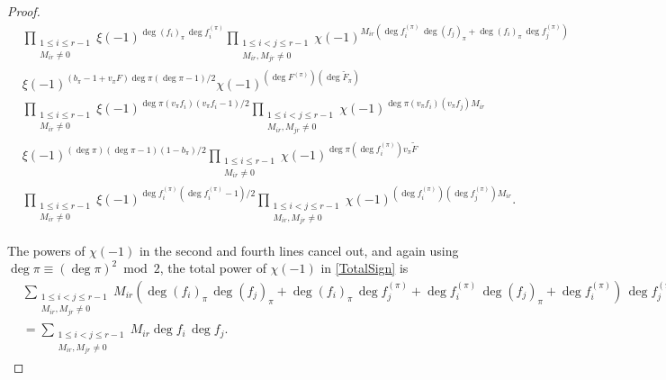\documentclass[11pt,letterpaper]{article}
\theoremstyle{definition}
\theoremstyle{remark}
\numberwithin{equation}{section}
\theoremstyle{dotless}
\renewcommand{\tilde}{\widetilde}
\begin{document}
\begin{proof}
\begin{equation} \label{TotalSign}
\begin{split}
& \prod_{\substack{1 \leq i \leq r-1 \\ M_{ir} \neq 0}} \xi(-1)^{\deg (f_i)_\pi \, \deg f_i^{(\pi)}} \prod_{\substack{1 \leq i<j \leq r-1 \\ M_{ir}, M_{jr} \neq 0}} \chi(-1)^{M_{ir}(\deg f_i^{(\pi)} \,\deg (f_j)_\pi + \deg (f_i)_{\pi} \,\deg f_j^{(\pi)})}  \\
&\xi(-1)^{(b_\pi-1+v_\pi F)\deg \pi(\deg \pi -1)/2} \chi(-1)^{(\deg F^{(\pi)})(\deg \tilde{F}_\pi)}\\
&\prod_{\substack{1 \leq i \leq r-1 \\ M_{ir} \neq 0}} \xi(-1)^{\deg \pi (v_\pi f_i)(v_\pi f_i-1)/2} \prod_{\substack{1 \leq i<j \leq r-1 \\ M_{ir}, M_{jr} \neq 0}} \chi(-1)^{\deg \pi(v_\pi f_i)(v_\pi f_j) M_{ir} } \\
& \xi(-1)^{(\deg \pi)(\deg \pi -1)(1-b_\pi)/2} \prod_{\substack{1 \leq i \leq r-1 \\ M_{ir} \neq 0}} \chi(-1)^{\deg \pi(\deg f_i^{(\pi)})v_\pi \tilde{F}} \\
&\prod_{\substack{1 \leq i \leq r-1 \\ M_{ir} \neq 0}} \xi(-1)^{\deg f_i^{(\pi)}(\deg f_i^{(\pi)}-1)/2} \prod_{\substack{1 \leq i<j \leq r-1 \\ M_{ir}, M_{jr} \neq 0}} \chi(-1)^{(\deg f_i^{(\pi)})(\deg f_j^{(\pi)}) M_{ir} }.
\end{split}
\end{equation}

The powers of $\chi(-1)$ in the second and fourth lines cancel out, and again using $\deg \pi \equiv (\deg \pi)^2 \bmod 2$, the total power of $\chi(-1)$ in \eqref{TotalSign} is 
\begin{equation*}
\begin{split}
    &\sum_{\substack{1 \leq i<j \leq r-1 \\ M_{ir}, M_{jr} \neq 0}} M_{ir}(\deg (f_i)_\pi \, \deg (f_j)_\pi+ \deg (f_i)_\pi \, \deg f_j^{(\pi)} + \deg f_i^{(\pi)} \, \deg (f_j)_\pi + \deg f_i^{(\pi)}) \, \deg f_j^{(\pi)} \\
    &=\sum_{\substack{1 \leq i<j \leq r-1 \\ M_{ir}, M_{jr} \neq 0}} M_{ir}\deg f_i \, \deg f_j.
\end{split}
\end{equation*}


\end{proof}
\end{document}
